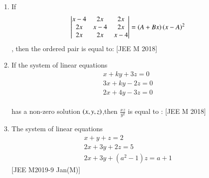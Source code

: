 \documentclass[journal,,12pt,twocolumn]{IEEEtran}
\theoremstyle{remark}
\begin{document}
\begin{enumerate}
\begin{enumerate}
\end{enumerate} 
\item If \begin{align*} \begin{vmatrix}
x-4 & 2x  & 2x\\
2x & x-4 & 2x \\
 2x & 2x & x-4 
\end{vmatrix} =\left(A+Bx\right)\left(x-A\right)^2\end{align*}, then the ordered pair  is equal to: 
\hfill{[JEE M 2018]}
\begin{enumerate}
\end{enumerate}
\item If the system of linear equations \\
\begin{align*}x+ky+3z=0 \\
3x+ky-2z=0 \\
2x+4y-3z=0 \end{align*}\\
has a non-zero solution $\left(x,y,z\right)$,then $\frac{xz}{y^2}$ is equal to :
\hfill{[JEE M 2018]}
\begin{enumerate}
\end{enumerate}
\item The system of linear equations \\
\begin{align*}x+y+z=2 \\
2x+3y+2z=5 \\
2x+3y+(a^2-1)z=a+1 \end{align*} 
\hfill{[JEE M2019-9 Jan(M)]}
\begin{enumerate}


\end{enumerate}
\end{enumerate}
\end{document}
